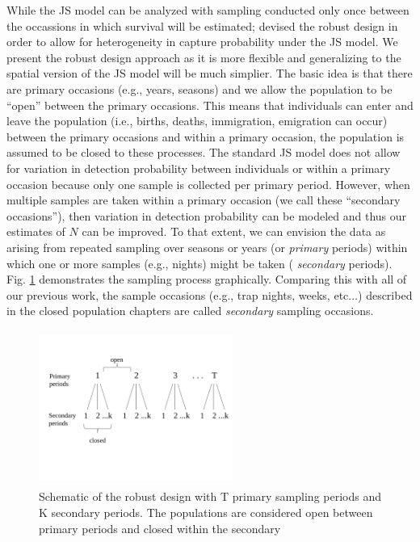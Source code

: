While the JS model can be analyzed with sampling conducted only once
between the occassions in which survival will be estimated;
\citet{pollock:1982} devised
 the robust design in order to allow for
heterogeneity in capture probability under the JS model.  We present
the robust design approach as it is more flexible and generalizing to
the spatial version of the JS model will be much simplier.  The basic
idea is that there are primary occasions (e.g., years, seasons) and we
allow the population to be ``open'' between the primary occasions.
This means that individuals can enter and leave the population (i.e.,
births, deaths, immigration, emigration can occur) between the primary
occasions and within a primary occasion, the population is assumed to
be closed to these processes.  The standard JS model does not allow
for variation in detection probability between individuals or within a
primary occasion because only one sample is collected per primary
period.  However, when multiple samples are taken within a primary
occasion (we call these ``secondary occasions''), then variation in
detection probability can be modeled and thus our estimates of $N$ can
be improved.  To that extent, we can envision the data as arising from
repeated sampling over seasons or years (or {\it primary} periods)
within which one or more samples (e.g., nights) might be taken ({\it
  secondary} periods). Fig. \ref{open.figs.robustdesign} demonstrates
the sampling process graphically.  Comparing this with all of our
previous work, the sample occasions %
(e.g., trap nights, weeks, etc$\dots$) described in the closed
population chapters are called {\it secondary} sampling occasions.



\begin{figure}[h]
\centering
\includegraphics[height=2in,width=2.5in]{Ch16-Open/figs/RobustDesign.pdf}
\caption{Schematic of the robust design with T primary sampling periods and K secondary periods. The populations
are considered open between primary periods and closed within the secondary}
\label{open.figs.robustdesign}
\end{figure}

